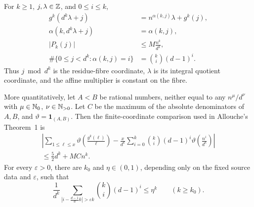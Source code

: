 \begin{theorem}
\label{thm:Allouche-affine-counting}
For \(k\ge1\), \(j,\lambda\in\mathbb{Z}\), and \(0\le i\le k\),
\begin{align}
 g^k(d^k\lambda+j)
  &=n^{\alpha(k,j)}\lambda+g^k(j),                        \label{eq:Allouche-affine}\\
 \alpha(k,d^k\lambda+j)&=\alpha(k,j),                     \label{eq:Allouche-alpha-fibre}\\
 |P_k(j)|&\le M\frac{n^k}{d^k},                           \label{eq:Allouche-remainder}\\
 \#\{0\le j<d^k:\alpha(k,j)=i\}
  &=\binom{k}{i}(d-1)^i.                                 \label{eq:Allouche-count}
\end{align}
Thus \(j\bmod d^k\) is the residue-fibre coordinate, \(\lambda\) is its
integral quotient coordinate, and the affine multiplier is constant on the
fibre.

More quantitatively, let \(A<B\) be rational numbers, neither equal to any
\(n^\mu/d^\nu\) with \(\mu\in\mathbb{N}_{0}\), \(\nu\in\mathbb{N}_{>0}\).  Let \(C\) be the
maximum of the absolute denominators of \(A,B\), and
\(\vartheta=\mathbf 1_{(A,B)}\).  Then the finite-coordinate comparison used
in Allouche's Theorem~1 is
\begin{multline}
\label{eq:Allouche-quantitative-handoff}
 \left|
 \sum_{1\le\ell\le x}
  \vartheta\left(\frac{g^k(\ell)}{\ell}\right)
 -\frac{x}{d^k}\sum_{i=0}^k
  \binom{k}{i}(d-1)^i
  \vartheta\left(\frac{n^i}{d^k}\right)
 \right|\\
 \le \frac52d^k+MCn^k.
\end{multline}
For every \(\varepsilon>0\), there are \(k_0\) and
\(\eta\in(0,1)\), depending only on the fixed source data and
\(\varepsilon\), such that
\begin{equation}
\label{eq:Allouche-binomial-concentration}
 \frac1{d^k}
 \sum_{\left|i-\frac{d-1}{d}k\right|>\varepsilon k}
 \binom{k}{i}(d-1)^i
 \le\eta^k
 \qquad(k\ge k_0).
\end{equation}
\end{theorem}

